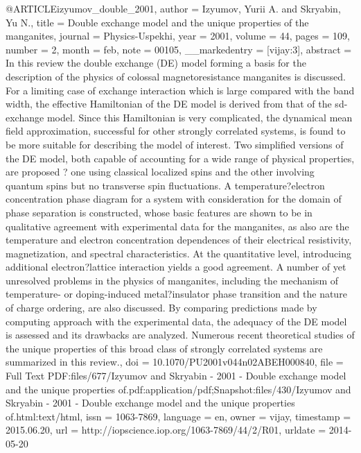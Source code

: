 @ARTICLE{izyumov_double_2001,
  author = {Izyumov, Yurii A. and Skryabin, Yu N.},
  title = {Double exchange model and the unique properties of the manganites},
  journal = {Physics-Uspekhi},
  year = {2001},
  volume = {44},
  pages = {109},
  number = {2},
  month = feb,
  note = {00105},
  __markedentry = {[vijay:3]},
  abstract = {In this review the double exchange (DE) model forming a basis for
	the description of the physics of colossal magnetoresistance manganites
	is discussed. For a limiting case of exchange interaction which is
	large compared with the band width, the effective Hamiltonian of
	the DE model is derived from that of the sd-exchange model. Since
	this Hamiltonian is very complicated, the dynamical mean field approximation,
	successful for other strongly correlated systems, is found to be
	more suitable for describing the model of interest. Two simplified
	versions of the DE model, both capable of accounting for a wide range
	of physical properties, are proposed ? one using classical localized
	spins and the other involving quantum spins but no transverse spin
	fluctuations. A temperature?electron concentration phase diagram
	for a system with consideration for the domain of phase separation
	is constructed, whose basic features are shown to be in qualitative
	agreement with experimental data for the manganites, as also are
	the temperature and electron concentration dependences of their electrical
	resistivity, magnetization, and spectral characteristics. At the
	quantitative level, introducing additional electron?lattice interaction
	yields a good agreement. A number of yet unresolved problems in the
	physics of manganites, including the mechanism of temperature- or
	doping-induced metal?insulator phase transition and the nature of
	charge ordering, are also discussed. By comparing predictions made
	by computing approach with the experimental data, the adequacy of
	the DE model is assessed and its drawbacks are analyzed. Numerous
	recent theoretical studies of the unique properties of this broad
	class of strongly correlated systems are summarized in this review.},
  doi = {10.1070/PU2001v044n02ABEH000840},
  file = {Full Text PDF:files/677/Izyumov and Skryabin - 2001 - Double exchange model and the unique properties of.pdf:application/pdf;Snapshot:files/430/Izyumov and Skryabin - 2001 - Double exchange model and the unique properties of.html:text/html},
  issn = {1063-7869},
  language = {en},
  owner = {vijay},
  timestamp = {2015.06.20},
  url = {http://iopscience.iop.org/1063-7869/44/2/R01},
  urldate = {2014-05-20}
}

